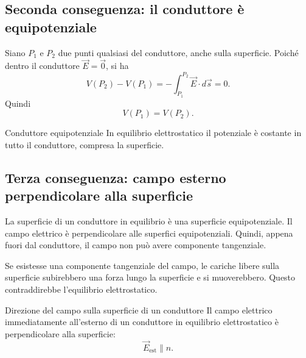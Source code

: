 \documentclass[a4paper]{article}
\begin{document}
\begin{center}
\end{center}

\subsection{Seconda conseguenza: il conduttore è equipotenziale}

Siano \(P_1\) e \(P_2\) due punti qualsiasi del conduttore, anche sulla superficie. Poiché dentro il conduttore \(\vec{E}=\vec{0}\), si ha
\[
    V(P_2)-V(P_1)=-\int_{P_1}^{P_2}\vec{E}\cdot d\vec{s}=0.
\]
Quindi
\[
    V(P_1)=V(P_2).
\]

\begin{snippetproposition}{Conduttore equipotenziale}
    In equilibrio elettrostatico il potenziale è costante in tutto il conduttore, compresa la superficie.
\end{snippetproposition}

\subsection{Terza conseguenza: campo esterno perpendicolare alla superficie}

La superficie di un conduttore in equilibrio è una superficie equipotenziale. Il campo elettrico è perpendicolare alle superfici equipotenziali. Quindi, appena fuori dal conduttore, il campo non può avere componente tangenziale.

Se esistesse una componente tangenziale del campo, le cariche libere sulla superficie subirebbero una forza lungo la superficie e si muoverebbero. Questo contraddirebbe l'equilibrio elettrostatico.

\begin{snippetproposition}{Direzione del campo sulla superficie di un conduttore}
    Il campo elettrico immediatamente all'esterno di un conduttore in equilibrio elettrostatico è perpendicolare alla superficie:
    \[
        \vec{E}_{\mathrm{est}}\parallel \hat{n}.
    \]
\end{snippetproposition}
\end{document}
